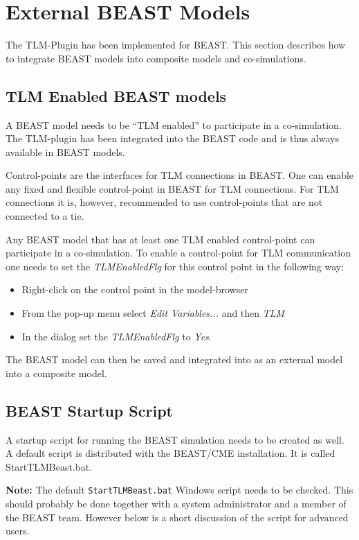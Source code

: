\chapter{External BEAST Models}
\label{MMBEAST}
The TLM-Plugin has been implemented for BEAST. 
This section describes how to integrate BEAST models into composite models and co-simulations.

\section{TLM Enabled BEAST models}
A BEAST model needs to be ``TLM enabled'' to participate in a co-simulation. 
The TLM-plugin has been integrated into the BEAST code and is thus always available in BEAST models.

Control-points are the interfaces for TLM connections in BEAST. 
One can enable any fixed and flexible control-point in BEAST for TLM connections. 
For TLM connections it is, however, recommended to use control-points that are not connected to a tie.

Any BEAST model that has at least one TLM enabled control-point can participate in a co-simulation. 
To enable a control-point for TLM communication one needs to set the {\em TLMEnabledFlg} for this control point in the following way:
\begin{itemize}
\item Right-click on the control point in the model-browser
\item From the pop-up menu select {\em Edit Variables...} and then {\em TLM}
\item In the dialog set the {\em TLMEnabledFlg} to {\em Yes}.
\end{itemize}


The BEAST model can then be saved and integrated into as an external model into a composite model.


\section{BEAST Startup Script}
A startup script for running the BEAST simulation needs to be created as well. 
A default script is distributed with the BEAST/CME installation. 
It is called StartTLMBeast.bat.

{\bf Note:} The default \verb!StartTLMBeast.bat! Windows script needs to be checked. 
This should probably be done together with a system administrator and a member of the BEAST team. 
However below is a short discussion of the script for advanced users.

